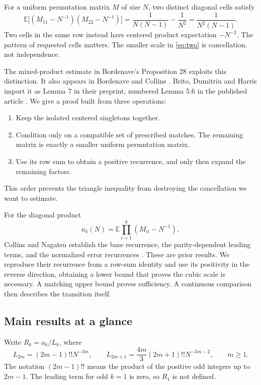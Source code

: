 \documentclass[11pt]{article}
\theoremstyle{definition}
\theoremstyle{remark}
\newcommand{\E}{\mathbb E}
\newcommand{\1}{\mathbf 1}
\begin{document}
For a uniform permutation matrix $M$ of size $N$, two distinct diagonal cells satisfy
\begin{equation}\label{eq:two}
\E\bigl[(M_{11}-N^{-1})(M_{22}-N^{-1})\bigr]
=\frac{1}{N(N-1)}-\frac{1}{N^2}
=\frac{1}{N^2(N-1)}.
\end{equation}
Two cells in the same row instead have centered product expectation $-N^{-2}$. The pattern of requested cells matters. The smaller scale in \eqref{eq:two} is cancellation, not independence.

The mixed-product estimate in Bordenave's Proposition 28 \cite{Bordenave} exploits this distinction. It also appears in Bordenave and Collins \cite[Proposition 22]{BC}. Brito, Dumitriu and Harris import it as Lemma 7 in their preprint, numbered Lemma 5.6 in the published article \cite{BDH}. We give a proof built from three operations:
\begin{enumerate}
\item Keep the isolated centered singletons together.
\item Condition only on a compatible set of prescribed matches. The remaining matrix is exactly a smaller uniform permutation matrix.
\item Use its row sum to obtain a positive recurrence, and only then expand the remaining factors.
\end{enumerate}
This order prevents the triangle inequality from destroying the cancellation we want to estimate.

For the diagonal product
\[
a_k(N)=\E\prod_{i=1}^k(M_{ii}-N^{-1}),
\]
Collins and Nagatsu establish the base recurrence, the parity-dependent leading terms, and the normalized error recurrences \cite[Proposition 3.3]{CN}. These are prior results. We reproduce their recurrence from a row-sum identity and use its positivity in the reverse direction, obtaining a lower bound that proves the cubic scale is necessary. A matching upper bound proves sufficiency. A continuous comparison then describes the transition itself.

\subsection{Main results at a glance}

Write $R_k=a_k/L_k$, where
\begin{equation}\label{eq:leading}
L_{2m}=(2m-1)!!N^{-3m},\qquad
L_{2m+1}=\frac{4m}{3}(2m+1)!!N^{-3m-2},\qquad m\ge1.
\end{equation}
The notation $(2m-1)!!$ means the product of the positive odd integers up to $2m-1$. The leading term for odd $k=1$ is zero, so $R_1$ is not defined.
\end{document}
